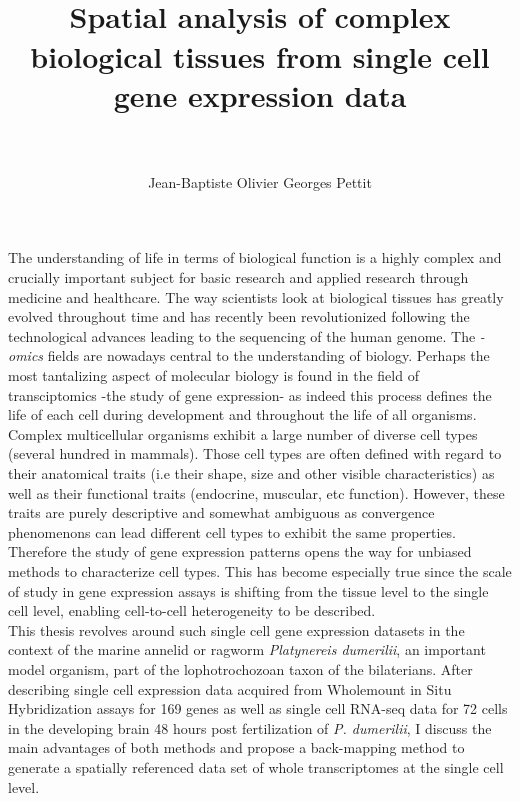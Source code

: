 \documentclass[paper=a4, fontsize=11pt]{scrartcl} %
\title{	
\normalfont \normalsize 
\horrule{0.5pt} \\[0.4cm] %
\huge Spatial analysis of complex biological tissues from single cell gene expression data \\ %
\horrule{2pt} \\[0.5cm] %
}
\author{Jean-Baptiste Olivier Georges Pettit} %
\numberwithin{equation}{section} %
\numberwithin{figure}{section} %
\numberwithin{table}{section} %
\begin{document}
\maketitle %


The understanding of life in terms of biological function is a highly complex and crucially important subject for basic research and applied research through medicine and healthcare. The way scientists look at biological tissues has greatly evolved throughout time and has recently been revolutionized following the technological advances leading to the sequencing of the human genome. The \emph{-omics} fields are nowadays central to the understanding of biology. Perhaps the most tantalizing aspect of molecular biology is found in the field of transciptomics -the study of gene expression- as indeed this process defines the life of each cell during development and throughout the life of all organisms.\\

Complex multicellular organisms exhibit a large number of diverse cell types (several hundred in mammals). Those cell types are often defined with regard to their anatomical traits (i.e their shape, size and other visible characteristics) as well as their functional traits (endocrine, muscular, etc function). However, these traits are purely descriptive and somewhat ambiguous as convergence phenomenons can lead different cell types to exhibit the same properties. Therefore the study of gene expression patterns opens the way for unbiased methods to characterize cell types. This has become especially true since the scale of study in gene expression assays is shifting from the tissue level to the single cell level, enabling cell-to-cell heterogeneity to be described.\\

This thesis revolves around such single cell gene expression datasets in the context of the marine annelid or ragworm \emph{Platynereis dumerilii}, an important model organism, part of the lophotrochozoan taxon of the bilaterians. After describing single cell expression data acquired from Wholemount in Situ Hybridization assays for 169 genes as well as single cell RNA-seq data for 72 cells in the developing brain 48 hours post fertilization of \emph{P. dumerilii}, I discuss the main advantages of both methods and propose a back-mapping method to generate a spatially referenced data set of whole transcriptomes at the single cell level.\\
\end{document}
